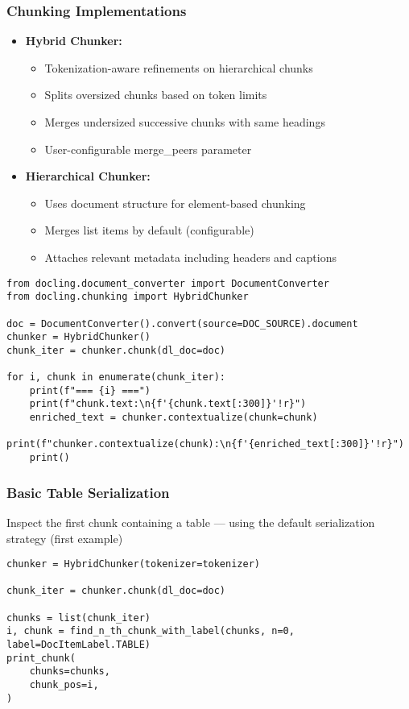 \begin{frame}[fragile]\frametitle{Chunking Implementations}
      \begin{itemize}
	\item \textbf{Hybrid Chunker:}
	\begin{itemize}
		\item Tokenization-aware refinements on hierarchical chunks
		\item Splits oversized chunks based on token limits
		\item Merges undersized successive chunks with same headings
		\item User-configurable merge\_peers parameter
	\end{itemize}
	\item \textbf{Hierarchical Chunker:}
	\begin{itemize}
		\item Uses document structure for element-based chunking  
		\item Merges list items by default (configurable)
		\item Attaches relevant metadata including headers and captions
	\end{itemize}
	  \end{itemize}
	  
\begin{lstlisting}
from docling.document_converter import DocumentConverter
from docling.chunking import HybridChunker

doc = DocumentConverter().convert(source=DOC_SOURCE).document
chunker = HybridChunker()
chunk_iter = chunker.chunk(dl_doc=doc)

for i, chunk in enumerate(chunk_iter):
    print(f"=== {i} ===")
    print(f"chunk.text:\n{f'{chunk.text[:300]}'!r}")
    enriched_text = chunker.contextualize(chunk=chunk)
    print(f"chunker.contextualize(chunk):\n{f'{enriched_text[:300]}'!r}")
    print()
\end{lstlisting}		  
\end{frame}

\begin{frame}[fragile]\frametitle{Basic Table Serialization}
Inspect the first chunk containing a table — using the default serialization strategy (first example)

	  
\begin{lstlisting}
chunker = HybridChunker(tokenizer=tokenizer)

chunk_iter = chunker.chunk(dl_doc=doc)

chunks = list(chunk_iter)
i, chunk = find_n_th_chunk_with_label(chunks, n=0, label=DocItemLabel.TABLE)
print_chunk(
    chunks=chunks,
    chunk_pos=i,
)

\end{lstlisting}		  
\end{frame}

